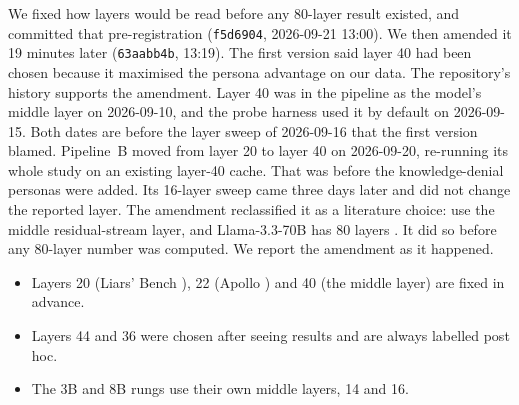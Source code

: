 We fixed how layers would be read before any 80-layer result existed, and committed that pre-registration (\texttt{f5d6904}, 2026-09-21 13:00). %
We then amended it 19 minutes later (\texttt{63aabb4b}, 13:19). %
The first version said layer 40 had been chosen because it maximised the persona advantage on our data. %
The repository's history supports the amendment. Layer 40 was in the pipeline as the model's middle layer on 2026-09-10, and the probe harness used it by default on 2026-09-15. Both dates are before the layer sweep of 2026-09-16 that the first version blamed. %
Pipeline~B moved from layer 20 to layer 40 on 2026-09-20, re-running its whole study on an existing layer-40 cache. That was before the knowledge-denial personas were added. %
Its 16-layer sweep came three days later and did not change the reported layer. %
The amendment reclassified it as a literature choice: \textcite[p.~3]{lu2026assistant} use the middle residual-stream layer, and Llama-3.3-70B has 80 layers \parencite[p.~14]{lu2026assistant}. It did so before any 80-layer number was computed. We report the amendment as it happened. %
\begin{itemize}
\item Layers 20 (Liars' Bench \parencite[p.~69]{kretschmar2025liars}), 22 (Apollo \parencite[p.~3]{goldowskydill2025detecting}) and 40 (the middle layer) are fixed in advance.
\item Layers 44 and 36 were chosen after seeing results and are always labelled post hoc. %
\item The 3B and 8B rungs use their own middle layers, 14 and 16. %
\end{itemize}

